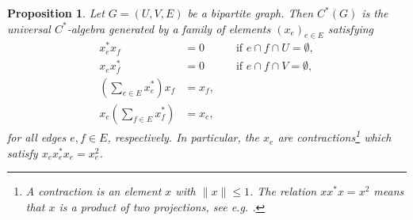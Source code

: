 \documentclass[a4paper]{amsart}
\newtheorem{proposition}[thm]{Proposition}
\begin{document}
\begin{proposition}
    \label{bga::proposition:alternative_definition}
    Let $G = (U, V, E)$ be a bipartite graph. Then $C^\ast(G)$ is the universal $C^\ast$-algebra generated by a family of elements $(x_e)_{e \in E}$ satisfying
    \begin{align}
        x_e^\ast x_f &= 0 & & \text{ if } e \cap f \cap U = \emptyset,  \tag{GC1} \label{bga::eq:gc1} \\
        x_e x_f^\ast &= 0 & & \text{ if } e \cap f \cap V = \emptyset,  \tag{GC2} \label{bga::eq:gc2} \\
        \left( \sum_{e \in E} x_e^\ast \right) x_f &= x_f,              \tag{GC3} \label{bga::eq:gc3} \\
        x_e \left( \sum_{f \in E} x_f^\ast \right) &= x_e,              \tag{GC4} \label{bga::eq:gc4}
    \end{align}
    for all edges $e, f \in E$, respectively. In particular, the $x_e$ are contractions\footnote{A contraction is an element $x$ with $\|x\| \leq 1$. The relation $x x^\ast x = x^2$ means that $x$ is a product of two projections, see e.g. \cite[Theorem 8]{radjavi_products_1969}.} which satisfy $x_e x_e^\ast x_e = x_e^2$.
\end{proposition}
\end{document}
